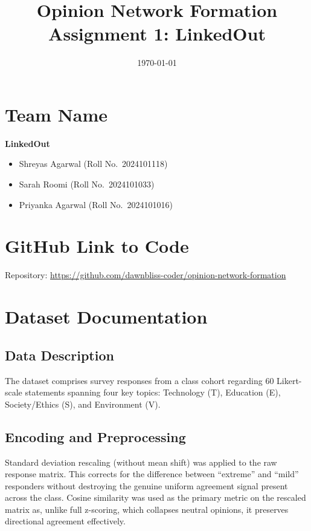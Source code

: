 \documentclass[11pt]{article}
\title{\vspace{-1.5em}Opinion Network Formation\\
\large Assignment 1: LinkedOut}
\date{\today}
\begin{document}
\maketitle
\vspace{-2em}

\section{Team Name}
\textbf{LinkedOut}

\begin{itemize}[nosep]
    \item Shreyas Agarwal (Roll No.\ 2024101118)
    \item Sarah Roomi (Roll No.\ 2024101033)
    \item Priyanka Agarwal (Roll No.\ 2024101016)
\end{itemize}

\section{GitHub Link to Code}
Repository: \url{https://github.com/dawnbliss-coder/opinion-network-formation}

\section{Dataset Documentation}

\subsection{Data Description}
The dataset comprises survey responses from a class cohort regarding 60 Likert-scale
statements spanning four key topics: Technology (T), Education (E), Society/Ethics (S),
and Environment (V).

\subsection{Encoding and Preprocessing}
Standard deviation rescaling (without mean shift) was applied to the raw response matrix. This corrects for the difference between
``extreme'' and ``mild'' responders without destroying the genuine uniform agreement signal present across the class. Cosine similarity was used
as the primary metric on the rescaled matrix as, unlike full z-scoring, which collapses neutral opinions, it preserves directional agreement
effectively.
\end{document}
